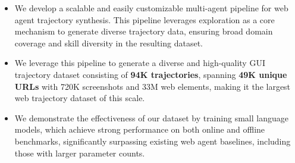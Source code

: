 \begin{itemize}

    \item We develop a scalable and easily customizable multi-agent pipeline for web agent trajectory synthesis. This pipeline leverages exploration as a core mechanism to generate diverse trajectory data, ensuring broad domain coverage and skill diversity in the resulting dataset.
    
    \item We leverage this pipeline to generate a diverse and high-quality GUI trajectory dataset consisting of \textbf{94K trajectories}, spanning \textbf{49K unique URLs} with 720K screenshots and 33M web elements, making it the largest web trajectory dataset of this scale.
    
   \item We demonstrate the effectiveness of our dataset by training small language models, which achieve strong performance on both online and offline benchmarks, significantly surpassing existing web agent baselines, including those with larger parameter counts.
\end{itemize}